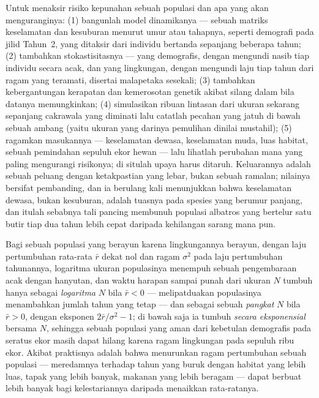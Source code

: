 \begin{method}\label{met:b3:conservation-biology:pva}
Untuk menaksir risiko kepunahan sebuah populasi dan apa yang akan
menguranginya: (1) bangunlah model dinamikanya --- sebuah matriks
keselamatan dan kesuburan menurut umur atau tahapnya, seperti demografi
pada jilid Tahun~2, yang ditaksir dari individu bertanda sepanjang
beberapa tahun; (2) tambahkan stokastisitasnya --- yang demografis, dengan
mengundi nasib tiap individu secara acak, dan yang lingkungan, dengan
mengundi laju tiap tahun dari ragam yang teramati, disertai malapetaka
sesekali; (3) tambahkan kebergantungan kerapatan dan kemerosotan genetik
akibat silang dalam bila datanya memungkinkan; (4) simulasikan ribuan
lintasan dari ukuran sekarang sepanjang cakrawala yang diminati lalu
catatlah pecahan yang jatuh di bawah sebuah ambang \emph{}
(yaitu ukuran yang darinya pemulihan dinilai mustahil); (5) ragamkan
masukannya --- keselamatan dewasa, keselamatan muda, luas habitat, sebuah
pemindahan sepuluh ekor hewan --- lalu lihatlah perubahan mana yang paling
mengurangi risikonya; di situlah upaya harus ditaruh. Keluarannya adalah
sebuah peluang dengan ketakpastian yang lebar, bukan sebuah ramalan;
nilainya bersifat pembanding, dan ia berulang kali menunjukkan bahwa
keselamatan dewasa, bukan kesuburan, adalah tuasnya pada spesies yang
berumur panjang, dan itulah sebabnya tali pancing membunuh populasi
albatros yang bertelur satu butir tiap dua tahun lebih cepat daripada
kehilangan sarang mana pun.
\end{method}

\begin{proposition}\label{prop:b3:conservation-biology:time}
Bagi sebuah populasi yang berayun karena lingkungannya berayun, dengan
laju pertumbuhan rata-rata $\bar r$ dekat nol dan ragam $\sigma^{2}$ pada
laju pertumbuhan tahunannya, logaritma ukuran populasinya menempuh sebuah
pengembaraan acak dengan hanyutan, dan waktu harapan sampai punah dari
ukuran $N$ tumbuh hanya sebagai \emph{logaritma} $N$ bila $\bar r < 0$ ---
melipatduakan populasinya menambahkan jumlah tahun yang tetap --- dan
sebagai sebuah \emph{pangkat} $N$ bila $\bar r > 0$, dengan eksponen
$2\bar r/\sigma^{2} - 1$; di bawah  saja ia tumbuh
\emph{secara eksponensial} bersama $N$, sehingga sebuah populasi yang aman
dari kebetulan demografis pada seratus ekor masih dapat hilang karena ragam
lingkungan pada sepuluh ribu ekor. Akibat praktisnya adalah bahwa
menurunkan ragam pertumbuhan sebuah populasi --- meredamnya terhadap tahun
yang buruk dengan habitat yang lebih luas, tapak yang lebih banyak,
makanan yang lebih beragam --- dapat berbuat lebih banyak bagi
kelestariannya daripada menaikkan rata-ratanya.
\end{proposition}
\admitted

